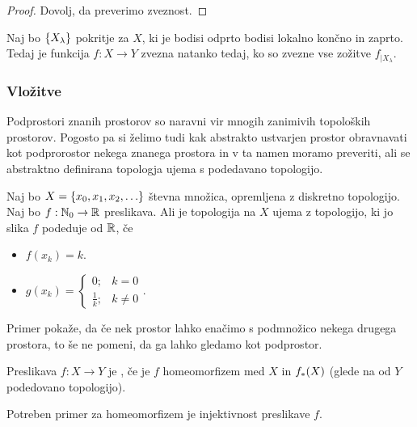 \begin{proof}
    Dovolj, da preverimo zveznost.
\end{proof}

\begin{posledica}
    Naj bo $\left\{X_\lambda\right\}$ pokritje za $X$, ki je bodisi odprto bodisi lokalno končno in zaprto. Tedaj je funkcija $f: X \to Y$ zvezna natanko tedaj, ko so zvezne vse zožitve $f_{|X_\lambda}$.
\end{posledica}

\subsubsection{Vložitve}
Podprostori znanih prostorov so naravni vir mnogih zanimivih topoloških prostorov. Pogosto pa si želimo tudi kak abstrakto ustvarjen prostor obravnavati kot podprorostor nekega znanega prostora in v ta namen moramo preveriti, ali se abstraktno definirana topologja ujema s podedavano topologijo.

\begin{primer}
    Naj bo $X = \left\{x_0, x_1, x_2, \ldots\right\}$ števna množica, opremljena z diskretno topologijo. Naj bo $f: \mathbb{N}_0 \to \mathbb{R}$ preslikava. Ali je topologija na $X$ ujema z topologijo, ki jo slika $f$ podeduje od $\mathbb{R}$, če
    \begin{itemize}
        \item $f(x_k) = k$.
        \item $g(x_k) = \begin{cases}
            0; &k = 0 \\ \frac{1}{k}; & k \neq 0
        \end{cases}.$
    \end{itemize}
\end{primer}

\begin{opomba}
    Primer pokaže, da če nek prostor lahko enačimo s podmnožico nekega drugega prostora, to še ne pomeni, da ga lahko gledamo kot podprostor.
\end{opomba}

\begin{definicija}
    Preslikava $f: X \to Y$ je , če je $f$ homeomorfizem med $X$ in $f_{*}(X)$ (glede na od $Y$ podedovano topologijo).
\end{definicija}

\begin{opomba}
    Potreben primer za homeomorfizem je injektivnost preslikave $f$. 
\end{opomba}


